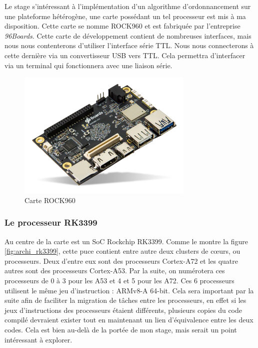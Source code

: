 Le stage s'intéressant à l'implémentation d'un algorithme d'ordonnancement sur une plateforme hétérogène, une carte possédant un tel processeur est mis à ma disposition. Cette carte se nomme ROCK960 et est fabriquée par l'entreprise \textit{96Boards}. Cette carte de développement contient de nombreuses interfaces, mais nous nous contenterons d'utiliser l'interface série TTL. Nous nous connecterons à cette dernière via un convertisseur USB vers TTL. Cela permettra d'interfacer via un terminal qui fonctionnera avec une liaison série. 

 \begin{figure}[H]
    \centering
    \includegraphics[width=0.75\textwidth]{Images/ROCK960.png}
    \caption{Carte ROCK960}
 \end{figure}



\subsubsection{Le processeur RK3399}
Au centre de la carte est un \gls{SoC} Rockchip RK3399. Comme le montre la figure \ref{fig:archi_rk3399}, cette puce contient entre autre deux clusters de cœurs, ou processeurs. Deux d'entre eux sont des processeurs Cortex-A72 et les quatre autres sont des processeurs Cortex-A53. Par la suite, on numérotera ces processeurs de 0 à 3 pour les A53 et 4 et 5 pour les A72. Ces 6 processeurs utilisent le même jeu d'instruction : ARMv8-A 64-bit. Cela sera important par la suite afin de faciliter la migration de tâches entre les processeurs, en effet si les jeux d'instructions des processeurs étaient différents, plusieurs copies du code compilé devraient exister tout en maintenant un lien d'équivalence entre les deux codes. Cela est bien au-delà de la portée de mon stage, mais serait un point intéressant à explorer.

